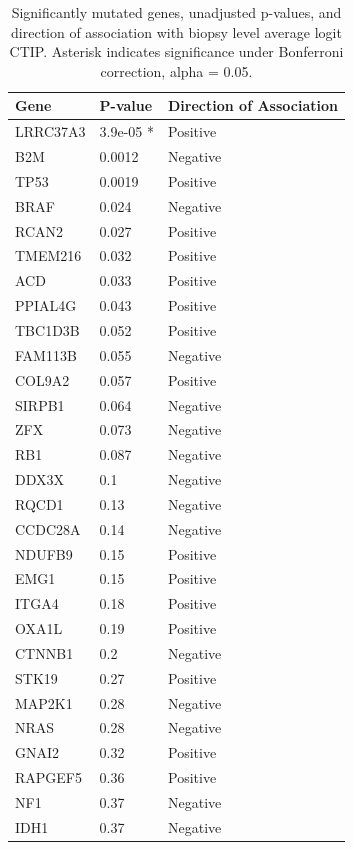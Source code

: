 \documentclass[
]{book}
\begin{document}
\begin{table}

\caption{\label{tab:SMG}Significantly mutated genes, unadjusted p-values, and direction of association with biopsy level average logit CTIP. Asterisk indicates significance under Bonferroni correction, alpha = 0.05.}
\centering
\begin{tabular}[t]{l|l|l}
\hline
Gene & P-value & Direction of Association\\
\hline
LRRC37A3 & 3.9e-05 * & Positive\\
\hline
B2M & 0.0012 & Negative\\
\hline
TP53 & 0.0019 & Positive\\
\hline
BRAF & 0.024 & Negative\\
\hline
RCAN2 & 0.027 & Positive\\
\hline
TMEM216 & 0.032 & Positive\\
\hline
ACD & 0.033 & Positive\\
\hline
PPIAL4G & 0.043 & Positive\\
\hline
TBC1D3B & 0.052 & Positive\\
\hline
FAM113B & 0.055 & Negative\\
\hline
COL9A2 & 0.057 & Positive\\
\hline
SIRPB1 & 0.064 & Negative\\
\hline
ZFX & 0.073 & Negative\\
\hline
RB1 & 0.087 & Negative\\
\hline
DDX3X & 0.1 & Negative\\
\hline
RQCD1 & 0.13 & Negative\\
\hline
CCDC28A & 0.14 & Negative\\
\hline
NDUFB9 & 0.15 & Positive\\
\hline
EMG1 & 0.15 & Positive\\
\hline
ITGA4 & 0.18 & Positive\\
\hline
OXA1L & 0.19 & Positive\\
\hline
CTNNB1 & 0.2 & Negative\\
\hline
STK19 & 0.27 & Positive\\
\hline
MAP2K1 & 0.28 & Negative\\
\hline
NRAS & 0.28 & Negative\\
\hline
GNAI2 & 0.32 & Positive\\
\hline
RAPGEF5 & 0.36 & Positive\\
\hline
NF1 & 0.37 & Negative\\
\hline
IDH1 & 0.37 & Negative\\

\end{tabular}
\end{table}
\end{document}

